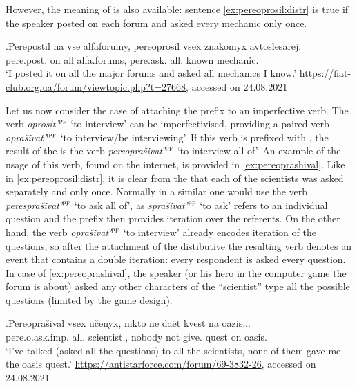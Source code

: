 However, the  meaning of  is also available: sentence \ref{ex:pereoprosil:distr} is true if the speaker posted on each forum and asked every mechanic only once.

\exg.\label{ex:pereoprosil:distr}Perepostil na vse alfaforumy, pereoprosil vsex znakomyx avtoslesarej.\\ 
pere.post. on all {alfa.forums}, pere.ask. all. known mechanic.\\
\trans `I posted it on all the major forums and asked all mechanics I know.' \url{https://fiat-club.org.ua/forum/viewtopic.php?t=27668}, accessed on 24.08.2021

Let us now consider the case of attaching the prefix  to an imperfective verb. The verb \textit{oprosit'}$^{\textsc{pf}}$ `to interview' can be imperfectivised, providing a paired verb \textit{opra\v{s}ivat'}$^{\textsc{ipf}}$ `to interview/be interviewing'. If this verb is prefixed with , the result of the  is the verb \textit{pereopra\v{s}ivat'}$^{\textsc{pf}}$ `to interview all of'. An example of the usage of this verb, found on the internet, is provided in \ref{ex:pereoprashival}. Like in \ref{ex:pereoprosil:distr}, it is clear from the  that each of the scientists was asked separately and only once. Normally in a similar  one would use the verb \textit{perespra\v{s}ivat'}$^{\textsc{pf}}$ `to ask all of', as \textit{spra\v{s}ivat'}$^{\textsc{pf}}$ `to ask' refers to an individual question and the prefix  then provides iteration over the referents. On the other hand, the verb \textit{opra\v{s}ivat'}$^{\textsc{pf}}$ `to interview' already encodes iteration of the questions, so after the attachment of the distibutive  the resulting verb denotes an event that contains a double iteration: every respondent is asked every question. In case of \ref{ex:pereoprashival}, the speaker (or his hero in the computer game the forum is about) asked any other characters of the ``scientist'' type all the possible questions (limited by the game design).\largerpage

\exg.\label{ex:pereoprashival}Pereopra\v{s}ival vsex u\v{c}\"{e}nyx, nikto ne da\"{e}t kvest na oazis...\\
pere.o.ask.imp. all. scientist., nobody not give. quest on oasis.\\
\trans `I've talked (asked all the questions) to all the scientists, none of them gave me the oasis quest.' \url{https://antistarforce.com/forum/69-3832-26}, accessed on 24.08.2021


